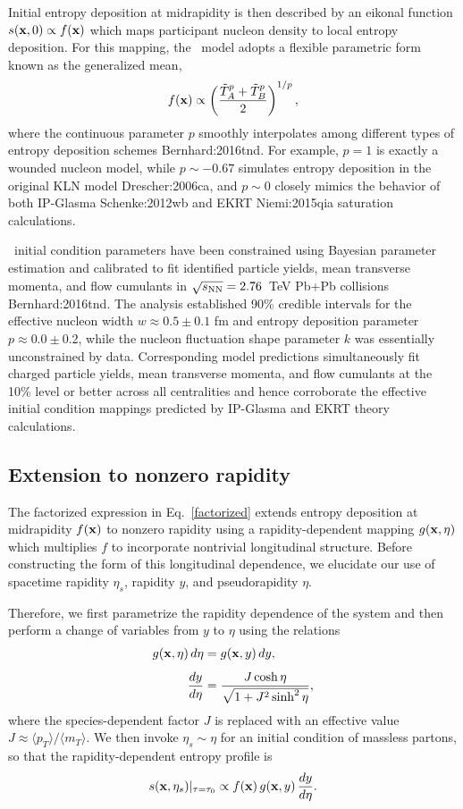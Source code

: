Initial entropy deposition at midrapidity is then described by an eikonal function $s(\mathbf x, 0) \propto f(\mathbf x)$ which maps participant nucleon density to local entropy deposition.
For this mapping, the \trento\ model adopts a flexible parametric form known as the generalized mean,
\begin{equation}
  \label{gen_mean}
        f(\mathbf x) \propto \left( \frac{\tilde{T}_A^p + \tilde{T}_B^p}{2} \right)^{1/p},
\end{equation}
where the continuous parameter $p$ smoothly interpolates among different types of entropy deposition schemes {Bernhard:2016tnd}.
For example, $p=1$ is exactly a wounded nucleon model, while $p\sim-0.67$ simulates entropy deposition in the original KLN model {Drescher:2006ca}, and $p \sim 0$ closely mimics the behavior of both IP-Glasma {Schenke:2012wb} and EKRT {Niemi:2015qia} saturation calculations.

\trento\ initial condition parameters have been constrained using Bayesian parameter estimation and calibrated to fit identified particle yields, mean transverse momenta, and flow cumulants in ${\sqrt{s_\mathrm{NN}}=2.76}$~TeV Pb+Pb collisions {Bernhard:2016tnd}.
The analysis established 90\% credible intervals for the effective nucleon width {$w \approx 0.5 \pm 0.1$ fm} and entropy deposition parameter ${p \approx 0.0 \pm 0.2}$, while the nucleon fluctuation shape parameter $k$ was essentially unconstrained by data.
Corresponding model predictions simultaneously fit charged particle yields, mean transverse momenta, and flow cumulants at the 10\% level or better across all centralities and hence corroborate the effective initial condition mappings predicted by IP-Glasma and EKRT theory calculations.


\subsection{Extension to nonzero rapidity}

The factorized expression in Eq.~\eqref{factorized} extends entropy deposition at midrapidity $f(\mathbf x)$ to nonzero rapidity using a rapidity-dependent mapping $g(\mathbf x, \eta)$ which multiplies $f$ to incorporate nontrivial longitudinal structure.
Before constructing the form of this longitudinal dependence, we elucidate our use of spacetime rapidity $\eta_s$, rapidity $y$, and pseudorapidity $\eta$.

Therefore, we first parametrize the rapidity dependence of the system and then perform a change of variables from $y$ to $\eta$ using the relations
\begin{align}
  g(\mathbf x, \eta)\, d\eta &= g(\mathbf x, y)\, dy, \\[1ex]
  \frac{dy}{d\eta} &= \frac{J \cosh \eta}{\sqrt{1 + J^2 \sinh^2 \eta}},
  \label{jacobian}
\end{align}
where the species-dependent factor $J$ is replaced with an effective value $J \approx \langle p_T \rangle / \langle m_T \rangle$.
We then invoke $\eta_s \sim \eta$ for an initial condition of massless partons, so that the rapidity-dependent entropy profile is
\begin{equation}
  s(\mathbf x, \eta_s)\vert_{\tau=\tau_0} \propto f(\mathbf x)\, g(\mathbf x, y)\, \frac{dy}{d\eta}.
\end{equation}

